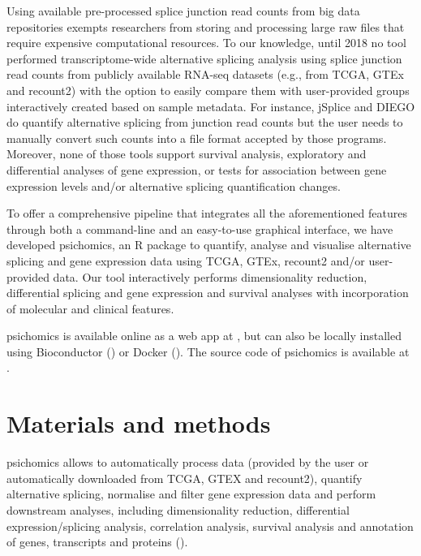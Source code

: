 Using available pre-processed splice junction read counts from big data repositories exempts researchers from storing and processing large raw files that require expensive computational resources. To our knowledge, until 2018 no tool performed transcriptome-wide alternative splicing analysis using splice junction read counts from publicly available RNA-seq datasets (e.g., from TCGA, GTEx and recount2) with the option to easily compare them with user-provided groups interactively created based on sample metadata. For instance, jSplice \cite{christinat:2016ui} and DIEGO \cite{doose:2018uv} do quantify alternative splicing from junction read counts but the user needs to manually convert such counts into a file format accepted by those programs. Moreover, none of those tools support survival analysis, exploratory and differential analyses of gene expression, or tests for association between gene expression levels and/or alternative splicing quantification changes.

To offer a comprehensive pipeline that integrates all the aforementioned features through both a command-line and an easy-to-use graphical interface, we have developed psichomics, an R package to quantify, analyse and visualise alternative splicing and gene expression data using TCGA, GTEx, recount2 and/or user-provided data. Our tool interactively performs dimensionality reduction, differential splicing and gene expression and survival analyses with incorporation of molecular and clinical features.


psichomics is available online as a web app at , but can also be locally installed using Bioconductor () or Docker (). The source code of psichomics is available at .

\section{Materials and methods}

psichomics allows to automatically process data (provided by the user or automatically downloaded from TCGA, GTEX and recount2), quantify alternative splicing, normalise and filter gene expression data and perform downstream analyses, including dimensionality reduction, differential expression/splicing analysis, correlation analysis, survival analysis and annotation of genes, transcripts and proteins ().

